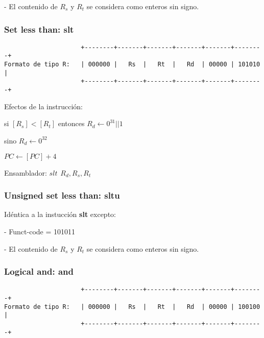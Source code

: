 \documentclass[letterpaper,11pt]{scrartcl}
\begin{document}
- El contenido de $R_{s}$ y $R_{t}$ se considera como enteros sin signo.


\subsubsection*{Set less than: \textbf{slt}}

\begin{verbatim}
                     +--------+-------+-------+-------+-------+--------+ 
Formato de tipo R:   | 000000 |   Rs  |   Rt  |   Rd  | 00000 | 101010 | 
                     +--------+-------+-------+-------+-------+--------+ 
\end{verbatim}

Efectos de la instrucción: 

si   $[R_{s}] < [R_{t}]$ entonces $R_{d} \leftarrow 0^{31} || 1$

sino $R_{d} \leftarrow 0^{32}$

$PC \leftarrow [PC] + 4$

Ensamblador: $slt\hspace{5pt}R_{d}, R_{s}, R_{t}$


\subsubsection*{Unsigned set less than: \textbf{sltu}}

Idéntica a la instucción \textbf{slt} excepto:

- Funct-code = 101011

- El contenido de $R_{s}$ y $R_{t}$ se considera como enteros sin signo.


\subsubsection*{Logical and: \textbf{and}}

\begin{verbatim}
                     +--------+-------+-------+-------+-------+--------+ 
Formato de tipo R:   | 000000 |   Rs  |   Rt  |   Rd  | 00000 | 100100 | 
                     +--------+-------+-------+-------+-------+--------+ 
\end{verbatim}
\end{document}
